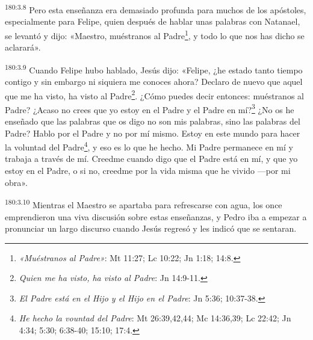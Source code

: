 \par 
\textsuperscript{180:3.8} Pero esta enseñanza era demasiado profunda para muchos de los apóstoles, especialmente para Felipe, quien después de hablar unas palabras con Natanael, se levantó y dijo: «Maestro, muéstranos al Padre\footnote{\textit{«Muéstranos al Padre»}: Mt 11:27; Lc 10:22; Jn 1:18; 14:8.}, y todo lo que nos has dicho se aclarará».

\par 
\textsuperscript{180:3.9} Cuando Felipe hubo hablado, Jesús dijo: «Felipe, ¿he estado tanto tiempo contigo y sin embargo ni siquiera me conoces ahora? Declaro de nuevo que aquel que me ha visto, ha visto al Padre\footnote{\textit{Quien me ha visto, ha visto al Padre}: Jn 14:9-11.}. ¿Cómo puedes decir entonces: muéstranos al Padre? ¿Acaso no crees que yo estoy en el Padre y el Padre en mí?\footnote{\textit{El Padre está en el Hijo y el Hijo en el Padre}: Jn 5:36; 10:37-38.} ¿No os he enseñado que las palabras que os digo no son mis palabras, sino las palabras del Padre? Hablo por el Padre y no por mí mismo. Estoy en este mundo para hacer la voluntad del Padre\footnote{\textit{He hecho la vountad del Padre}: Mt 26:39,42,44; Mc 14:36,39; Lc 22:42; Jn 4:34; 5:30; 6:38-40; 15:10; 17:4.}, y eso es lo que he hecho. Mi Padre permanece en mí y trabaja a través de mí. Creedme cuando digo que el Padre está en mí, y que yo estoy en el Padre, o si no, creedme por la vida misma que he vivido ---por mi obra».

\par 
\textsuperscript{180:3.10} Mientras el Maestro se apartaba para refrescarse con agua, los once emprendieron una viva discusión sobre estas enseñanzas, y Pedro iba a empezar a pronunciar un largo discurso cuando Jesús regresó y les indicó que se sentaran.


